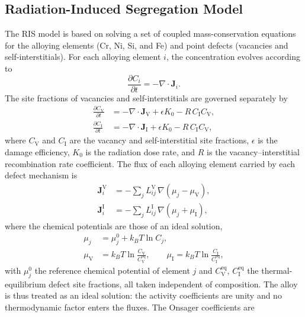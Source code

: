 \documentclass[3p,times,nonatbib]{elsarticle} %
\newcommand{\Vac}{\mathrm{V}}          %
\newcommand{\Int}{\mathrm{I}}          %
\begin{document}
\subsection{Radiation-Induced Segregation Model}
\label{sec:methodRIS}

The RIS model is based on solving a set of coupled mass-conservation equations for the
alloying elements (Cr, Ni, Si, and Fe) and point defects (vacancies and
self-interstitials). For each alloying element \(i\), the concentration evolves
according to
\begin{equation}
\frac{\partial C_i}{\partial t}=-\nabla\!\cdot\mathbf{J}_i .
\label{eq:mass-metal}
\end{equation}
The site fractions of vacancies and self-interstitials are governed separately by
\begin{align}
\frac{\partial C_{\Vac}}{\partial t}
 &= -\nabla\!\cdot\mathbf{J}_{\Vac}+\epsilon K_0-R\,C_{\Int}C_{\Vac},
\label{eq:mass-vac}\\
\frac{\partial C_{\Int}}{\partial t}
 &= -\nabla\!\cdot\mathbf{J}_{\Int}+\epsilon K_0-R\,C_{\Int}C_{\Vac},
\label{eq:mass-int}
\end{align}
where \(C_{\Vac}\) and \(C_{\Int}\) are the vacancy and self-interstitial site
fractions, \(\epsilon\) is the damage efficiency, \(K_0\) is the radiation dose rate,
and \(R\) is the vacancy--interstitial recombination rate coefficient. The flux of each
alloying element carried by each defect mechanism is
\begin{align}
\mathbf{J}_i^{\Vac} &= -\sum_j L_{ij}^{\Vac}\,
   \nabla\!\left(\mu_j-\mu_{\Vac}\right),
\label{eq:flux-vac}\\
\mathbf{J}_i^{\Int} &= -\sum_j L_{ij}^{\Int}\,
   \nabla\!\left(\mu_j+\mu_{\Int}\right),
\label{eq:flux-int}
\end{align}
where the chemical potentials are those of an ideal solution,
\begin{align}
\mu_j &= \mu_j^{0}+k_BT\ln C_j,
\label{eq:mu-atom}\\
\mu_{\Vac} &= k_BT\ln\frac{C_{\Vac}}{C_{\Vac}^{\mathrm{eq}}},\qquad
\mu_{\Int} = k_BT\ln\frac{C_{\Int}}{C_{\Int}^{\mathrm{eq}}},
\label{eq:mu-defect}
\end{align}
with \(\mu_j^{0}\) the reference chemical potential of element \(j\) and
\(C_{\Vac}^{\mathrm{eq}}\), \(C_{\Int}^{\mathrm{eq}}\) the thermal-equilibrium
defect site fractions, all taken independent of composition. The alloy is thus
treated as an ideal solution: the activity coefficients are unity and no
thermodynamic factor enters the fluxes. The Onsager coefficients are
\end{document}
